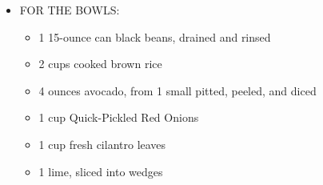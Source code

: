 \documentclass[../cookbook]{subfiles}
\begin{document}
{\begin{minipage}[t]{\the\dimexpr0.35\textwidth}
\begin{itemize}[label=,before=\bfseries]
\begin{itemize}[before=\mdseries]
          \item 1 chipotle pepper in adobo sauce
          \item 2 tablespoons lime juice
          \item 2 cloves garlic, peeled
          \item Kosher salt
        \end{itemize}
      \item FOR THE BOWLS:
        \begin{itemize}[before=\mdseries]
          \item 1 15-ounce can black beans, drained and rinsed
          \item 2 cups cooked brown rice
          \item 4 ounces avocado, from 1 small pitted, peeled, and diced
          \item 1 cup Quick-Pickled Red Onions
          \item 1 cup fresh cilantro leaves
          \item 1 lime, sliced into wedges
        \end{itemize}
    \end{itemize}
  \end{minipage}
}
\end{document}
